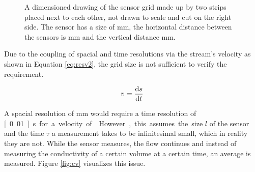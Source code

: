 \begin{figure}
\begin{center}
		\caption[A dimensioned drawing of the sensor grid.]{A dimensioned drawing of the sensor grid made up by two strips placed next to each other, not drawn to scale and cut on the right side. The sensor has a size of \unit[10x11]{mm}, the horizontal distance between the sensors is \unit[50]{mm} and the vertical distance \unit[25]{mm}.}
		\label{fig:sensarray}
	\end{center}
\end{figure}

Due to the coupling of spacial and time resolutions via the stream's velocity as shown in Equation \eqref{eq:resv2}, the grid size is not sufficient to verify the requirement. 

\begin{equation}
	v = \dfrac{\mathop{}\!\mathrm{d} s}{\mathop{}\!\mathrm{d} t}
\label{eq:resv2} 
\end{equation}

A spacial resolution of \unit[10]{mm} would require a time resolution of \unit[0.01]{s} for a velocity of . However, this assumes the size $ l $ of the sensor and the time $ \tau $ a measurement takes to be infinitesimal small, which in reality they are not. While the sensor measures, the flow continues and instead of measuring the conductivity of a certain volume at a certain time, an average is measured. Figure \ref{fig:cv} visualizes this issue.

